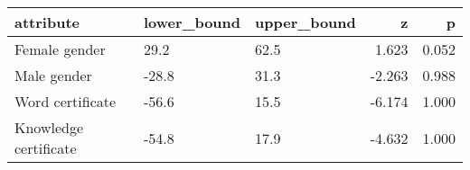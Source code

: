 
\begin{tabular}{lllrr}
\toprule
attribute & lower\_bound & upper\_bound & z & p\\
\midrule
Female gender & 29.2 & 62.5 & 1.623 & 0.052\\
Male gender & -28.8 & 31.3 & -2.263 & 0.988\\
Word certificate & -56.6 & 15.5 & -6.174 & 1.000\\
Knowledge certificate & -54.8 & 17.9 & -4.632 & 1.000\\
\bottomrule
\end{tabular}
